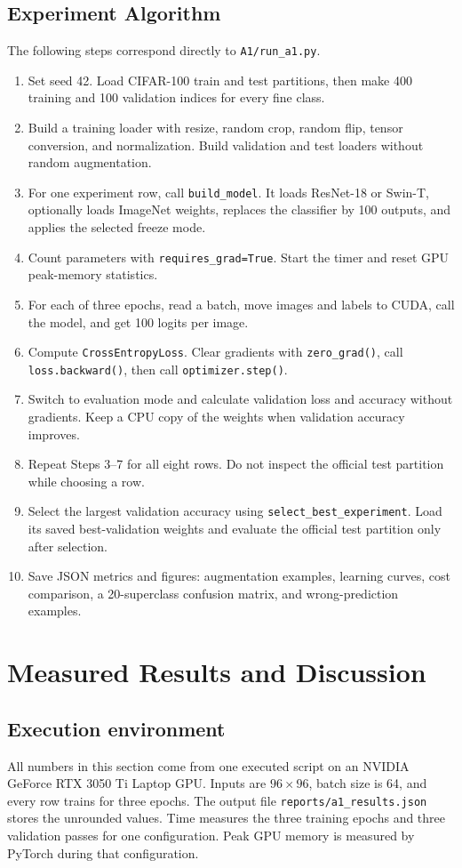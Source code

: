 \documentclass[oneside]{hcmut-report}
\begin{document}
\subsection{Experiment Algorithm}
The following steps correspond directly to \texttt{A1/run\_a1.py}.
\begin{enumerate}[leftmargin=8mm]
  \item Set seed 42. Load CIFAR-100 train and test partitions, then make 400 training and 100 validation indices for every fine class.
  \item Build a training loader with resize, random crop, random flip, tensor conversion, and normalization. Build validation and test loaders without random augmentation.
  \item For one experiment row, call \texttt{build\_model}. It loads ResNet-18 or Swin-T, optionally loads ImageNet weights, replaces the classifier by 100 outputs, and applies the selected freeze mode.
  \item Count parameters with \texttt{requires\_grad=True}. Start the timer and reset GPU peak-memory statistics.
  \item For each of three epochs, read a batch, move images and labels to CUDA, call the model, and get 100 logits per image.
  \item Compute \texttt{CrossEntropyLoss}. Clear gradients with \texttt{zero\_grad()}, call \texttt{loss.backward()}, then call \texttt{optimizer.step()}.
  \item Switch to evaluation mode and calculate validation loss and accuracy without gradients. Keep a CPU copy of the weights when validation accuracy improves.
  \item Repeat Steps 3--7 for all eight rows. Do not inspect the official test partition while choosing a row.
  \item Select the largest validation accuracy using \texttt{select\_best\_experiment}. Load its saved best-validation weights and evaluate the official test partition only after selection.
  \item Save JSON metrics and figures: augmentation examples, learning curves, cost comparison, a 20-superclass confusion matrix, and wrong-prediction examples.
\end{enumerate}

\clearpage
\section{Measured Results and Discussion}
\subsection{Execution environment}
All numbers in this section come from one executed script on an NVIDIA GeForce RTX 3050 Ti Laptop GPU. Inputs are $96\times96$, batch size is 64, and every row trains for three epochs. The output file \texttt{reports/a1\_results.json} stores the unrounded values. Time measures the three training epochs and three validation passes for one configuration. Peak GPU memory is measured by PyTorch during that configuration.
\end{document}
